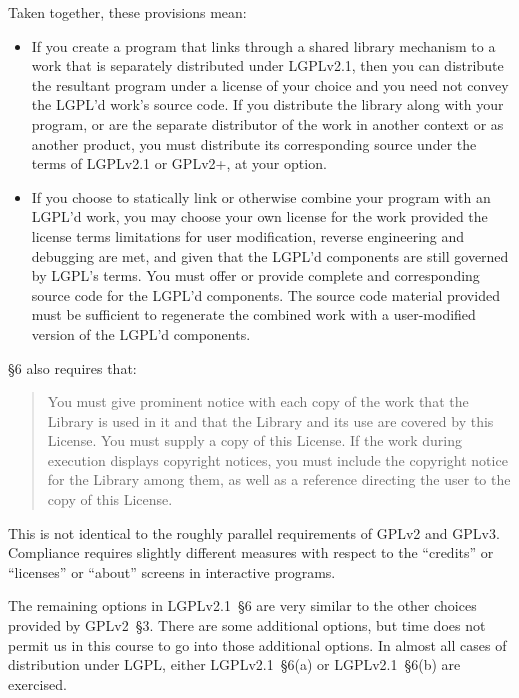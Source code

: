 Taken together, these provisions mean:

\begin{itemize}

\item    If you create a program that links through a shared library mechanism to
    a work that is separately distributed under LGPLv2.1, then you can
    distribute the resultant program under a license of your choice and you
    need not convey the LGPL’d work’s source code. If you distribute the
    library along with your program, or are the separate distributor of the
    work in another context or as another product, you must distribute its
    corresponding source under the terms of LGPLv2.1 or GPLv2+, at your
    option.

\item    If you choose to statically link or otherwise combine your program with
    an LGPL’d work, you may choose your own license for the work provided the
    license terms limitations for user modification, reverse engineering and
    debugging are met, and given that the LGPL’d components are still
    governed by LGPL’s terms. You must offer or provide complete and
    corresponding source code for the LGPL’d components. The source code
    material provided must be sufficient to regenerate the combined work with
    a user-modified version of the LGPL’d components.
\end{itemize}


\S6 also requires that:

\begin{quotation}
    You must give prominent notice with each copy of the work that the
    Library is used in it and that the Library and its use are covered by
    this License. You must supply a copy of this License. If the work during
    execution displays copyright notices, you must include the copyright
    notice for the Library among them, as well as a reference directing the
    user to the copy of this License.
\end{quotation}

This is not identical to the roughly parallel requirements of GPLv2 and
GPLv3. Compliance requires slightly different measures with respect to the
``credits'' or ``licenses'' or ``about'' screens in interactive programs.



The remaining options in LGPLv2.1~\S6 are very similar to the other choices
provided by GPLv2~\S3. There are some additional options, but time does
not permit us in this course to go into those additional options. In
almost all cases of distribution under LGPL, either LGPLv2.1~\S6(a) or LGPLv2.1~\S6(b) are
exercised.

